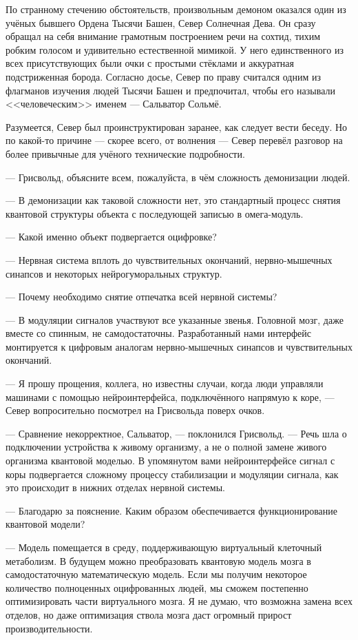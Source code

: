 По странному стечению обстоятельств, произвольным демоном оказался один из учёных бывшего Ордена Тысячи Башен, Север Солнечная Дева.
Он сразу обращал на себя внимание грамотным построением речи на сохтид, тихим робким голосом и удивительно естественной мимикой.
У него единственного из всех присутствующих были очки с простыми стёклами и аккуратная подстриженная борода.
Согласно досье, Север по праву считался одним из флагманов изучения людей Тысячи Башен и предпочитал, чтобы его называли <<человеческим>> именем --- Сальватор Сольмё.

Разумеется, Север был проинструктирован заранее, как следует вести беседу.
Но по какой-то причине --- скорее всего, от волнения --- Север перевёл разговор на более привычные для учёного технические подробности.

--- Грисвольд, объясните всем, пожалуйста, в чём сложность демонизации людей.

--- В демонизации как таковой сложности нет, это стандартный процесс снятия квантовой структуры объекта с последующей записью в омега-модуль.

--- Какой именно объект подвергается оцифровке?

--- Нервная система вплоть до чувствительных окончаний, нервно-мышечных синапсов и некоторых нейрогуморальных структур.

--- Почему необходимо снятие отпечатка всей нервной системы?

--- В модуляции сигналов участвуют все указанные звенья.
Головной мозг, даже вместе со спинным, не самодостаточны.
Разработанный нами интерфейс монтируется к цифровым аналогам нервно-мышечных синапсов и чувствительных окончаний.

--- Я прошу прощения, коллега, но известны случаи, когда люди управляли машинами с помощью нейроинтерфейса, подключённого напрямую к коре, --- Север вопросительно посмотрел на Грисвольда поверх очков.

--- Сравнение некорректное, Сальватор, --- поклонился Грисвольд.
--- Речь шла о подключении устройства к живому организму, а не о полной замене живого организма квантовой моделью.
В упомянутом вами нейроинтерфейсе сигнал с коры подвергается сложному процессу стабилизации и модуляции сигнала, как это происходит в нижних отделах нервной системы.

--- Благодарю за пояснение.
Каким образом обеспечивается функционирование квантовой модели?

--- Модель помещается в среду, поддерживающую виртуальный клеточный метаболизм.
В будущем можно преобразовать квантовую модель мозга в самодостаточную математическую модель.
Если мы получим некоторое количество полноценных оцифрованных людей, мы сможем постепенно оптимизировать части виртуального мозга.
Я не думаю, что возможна замена всех отделов, но даже оптимизация ствола мозга даст огромный прирост производительности.

